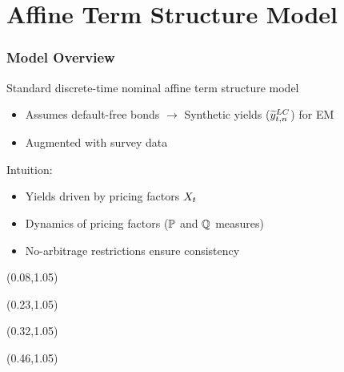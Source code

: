 \documentclass[12pt, aspectratio=169, xcolor=dvipsnames]{beamer}
\begin{document}


\section{Affine Term Structure Model}

\begin{frame}[label=ATSMsummary]
\frametitle{Model Overview}
	
	Standard discrete-time nominal affine term structure model
	\begin{itemize}
		\item Assumes default-free bonds \(\rightarrow\) \alert{Synthetic} yields (\(\widetilde{y}_{t,n} ^{LC}\)) for EM
		\item \alert{Augmented} with survey data
	\end{itemize}
	
	Intuition:
	\begin{itemize}
		\item Yields driven by pricing factors \(X_{t}\)
		\item Dynamics of pricing factors (\(\mathbb{P}\) and \(\mathbb{Q}\) measures)
		\item No-arbitrage restrictions ensure consistency %
	\end{itemize}
	
	\begin{textblock*}{3cm}(0.08\textwidth,1.05\textheight)
	\hyperlink{AssetPricing}{}
	\end{textblock*}
	\begin{textblock*}{3cm}(0.23\textwidth,1.05\textheight)
		\hyperlink{SDF}{}
	\end{textblock*}
	\begin{textblock*}{3cm}(0.32\textwidth,1.05\textheight)
		\hyperlink{BondPrices}{}
	\end{textblock*}
	\begin{textblock*}{3cm}(0.46\textwidth,1.05\textheight)
		\hyperlink{SvyAugModel}{}
	\end{textblock*}
\end{frame}
\end{document}
